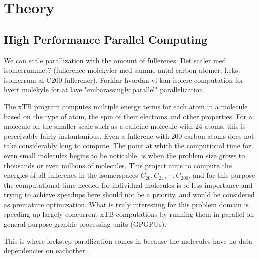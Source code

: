 \section{Theory}

\subsection{High Performance Parallel Computing}

We can scale parallization with the amount of fullerenes. Det scaler med isomerrummet? (fullerence molekyler med samme antal carbon atomer, f.eks. isomerrum af C200 fullerener).
Forklar hvordan vi kan isolere computation for hvert molekyle for at lave "embarassingly parallel" parallelization.



The xTB program computes multiple energy terms for each atom in a molecule based on the type of atom, the spin of their electrons and other properties.
For a molecule on the smaller scale such as a caffeine molecule with 24 atoms, this is perceivably fairly instantanious. Even a fullerene with 200 carbon atoms does not take considerably long to compute. The point at which the computional time for even small molecules begins to be noticable, is when the problem size grows to thousands or even millions of molecules.
This project aims to compute the energies of all fullerenes in the isomerspaces \(C_{20}, C_{24}, \cdots, C_{200} \), and for this purpose the computational time needed for individual molecules is of less importance and trying to achieve speedups here should not be a priority, and would be considered as premature optimization. What is truly interesting for this problem domain is speeding up largely concurrent xTB computations by running them in parallel on general purpose graphic processing units (GPGPUs).

This is where lockstep parallization comes in because the molecules have no data dependencies on eachother...
